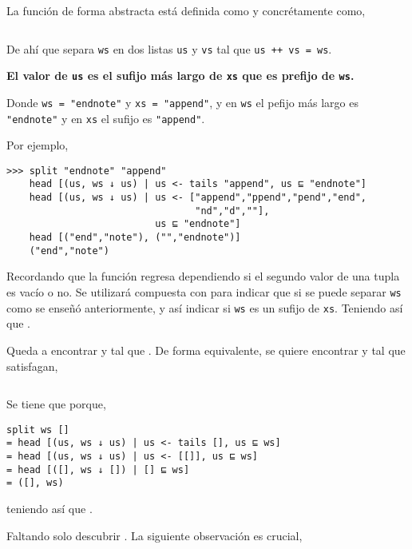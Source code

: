 La función  de forma abstracta está definida como  y
concrétamente como,

\inputminted{haskell}{definiciones/kmp/1-down-arrow.hs}

De ahí que  separa \texttt{ws} en dos listas \texttt{us} y \texttt{vs} tal que
\texttt{us ++ vs = ws}.

\begin{center}
\textbf{El valor de \texttt{us} es el sufijo más largo de \texttt{xs} que es prefijo de \texttt{ws}.}
\end{center}

Donde \texttt{ws = "{}endnote"} y \texttt{xs = "{}append"}, y en \texttt{ws} el pefijo más largo
es \texttt{"\color{purple}{}end\color{black}note"} y en \texttt{xs} el sufijo es
\texttt{"{}app\color{purple}end\color{black}"}.

Por ejemplo,
\begin{verbatim}
>>> split "endnote" "append"
    head [(us, ws ↓ us) | us <- tails "append", us ⊑ "endnote"]
    head [(us, ws ↓ us) | us <- ["append","ppend","pend","end",
                                 "nd","d",""],
                          us ⊑ "endnote"]
    head [("end","note"), ("","endnote")]
    ("end","note")
\end{verbatim}

Recordando que la función  regresa  dependiendo si el segundo valor
de una tupla es vacío o no. Se utilizará compuesta con  para indicar que si se
puede separar \texttt{ws} como se enseñó anteriormente, y así indicar si \texttt{ws} es un sufijo
de \texttt{xs}. Teniendo así que .

Queda a encontrar  y  tal que . De forma
equivalente, se quiere encontrar  y  tal que satisfagan, 

\inputminted{haskell}{definiciones/kmp/1-split-eq.hs}

Se tiene que  porque, 
\begin{verbatim}
split ws []
= head [(us, ws ↓ us) | us <- tails [], us ⊑ ws]
= head [(us, ws ↓ us) | us <- [[]], us ⊑ ws]
= head [([], ws ↓ []) | [] ⊑ ws]
= ([], ws)
\end{verbatim}

teniendo así que .

Faltando solo descubrir . La siguiente observación es crucial,

